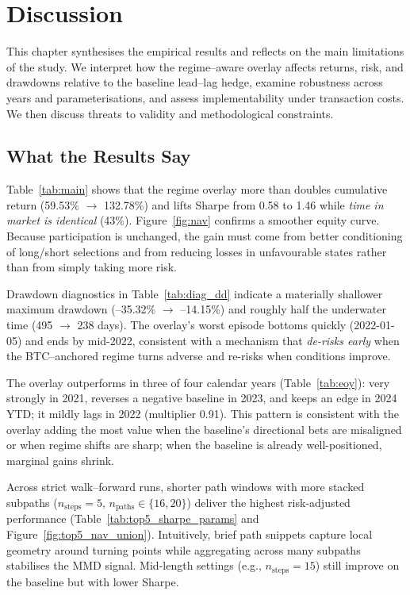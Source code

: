 \chapter{Discussion}\label{Chapter:Discussion}

This chapter synthesises the empirical results and reflects on the main limitations of the study. We interpret how the regime–aware overlay affects returns, risk, and drawdowns relative to the baseline lead–lag hedge, examine robustness across years and parameterisations, and assess implementability under transaction costs. We then discuss threats to validity and methodological constraints.

\section{What the Results Say}\label{sec:disc:findings}

Table~\ref{tab:main} shows that the regime overlay more than doubles cumulative return (59.53\% $\to$ 132.78\%) and lifts Sharpe from 0.58 to 1.46 while \emph{time in market is identical} (43\%). Figure~\ref{fig:nav} confirms a smoother equity curve. Because participation is unchanged, the gain must come from better conditioning of long/short selections and from reducing losses in unfavourable states rather than from simply taking more risk.

Drawdown diagnostics in Table~\ref{tab:diag_dd} indicate a materially shallower maximum drawdown (–35.32\% $\to$ –14.15\%) and roughly half the underwater time (495 $\to$ 238 days). The overlay’s worst episode bottoms quickly (2022-01-05) and ends by mid-2022, consistent with a mechanism that \emph{de-risks early} when the BTC–anchored regime turns adverse and re-risks when conditions improve.

The overlay outperforms in three of four calendar years (Table~\ref{tab:eoy}): very strongly in 2021, reverses a negative baseline in 2023, and keeps an edge in 2024 YTD; it mildly lags in 2022 (multiplier 0.91). This pattern is consistent with the overlay adding the most value when the baseline’s directional bets are misaligned or when regime shifts are sharp; when the baseline is already well-positioned, marginal gains shrink.


Across strict walk–forward runs, shorter path windows with more stacked subpaths (\(n_{\text{steps}}{=}5\), \(n_{\text{paths}}\in\{16,20\}\)) deliver the highest risk-adjusted performance (Table~\ref{tab:top5_sharpe_params} and Figure~\ref{fig:top5_nav_union}). Intuitively, brief path snippets capture local geometry around turning points while aggregating across many subpaths stabilises the MMD signal. Mid-length settings (e.g., \(n_{\text{steps}}{=}15\)) still improve on the baseline but with lower Sharpe.

